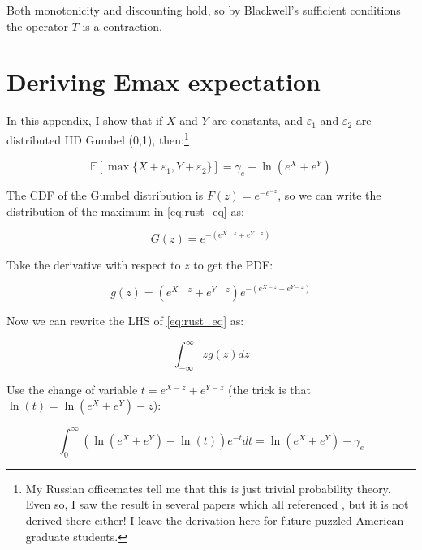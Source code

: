 \documentclass[]{article}
\begin{document}
Both monotonicity and discounting hold, so by Blackwell's sufficient conditions the operator $T$ is a contraction.

\section{Deriving Emax expectation}
\label{sec:exp_der}

In this appendix, I show that if $X$ and $Y$ are constants, and $\varepsilon_1$ and $\varepsilon_2$ are distributed IID Gumbel (0,1), then:\footnote{My Russian officemates tell me that this is just trivial probability theory.  Even so, I saw the result in several papers which all referenced \citet{rust1987optimal}, but it is not derived there either!  I leave the derivation here for future puzzled American graduate students.}

\begin{equation}
    \mathbb{E} \left[\max\{X + \varepsilon_1, Y + \varepsilon_2\}\right] = \gamma_e + \ln \left(e^{X} + e^{Y}\right)
    \label{eq:rust_eq}
\end{equation}

The CDF of the Gumbel distribution is $F(z) = e^{-e^{-z}}$, so we can write the distribution of the maximum in \eqref{eq:rust_eq} as:

\begin{equation}
    G(z) = e^{-\left(e^{X - z} + e^{Y - z}\right)}
\end{equation}

Take the derivative with respect to $z$ to get the PDF:

\begin{equation}
    g(z) = \left(e^{X - z} + e^{Y - z}\right) e^{-\left(e^{X - z} + e^{Y - z}\right)}
\end{equation}

Now we can rewrite the LHS of \eqref{eq:rust_eq} as:

\begin{equation}
    \int_{-\infty}^\infty z g(z) dz 
\end{equation}

Use the change of variable $t = e^{X - z} + e^{Y - z}$ (the trick is that $\ln(t) = \ln\left(e^X + e^Y\right) - z$):

\begin{equation}
    \int_{0}^\infty \left(\ln \left(e^X + e^Y\right) - \ln(t)\right) e^{-t} dt = \ln \left(e^X + e^Y\right) + \gamma_e
\end{equation}
\end{document}
